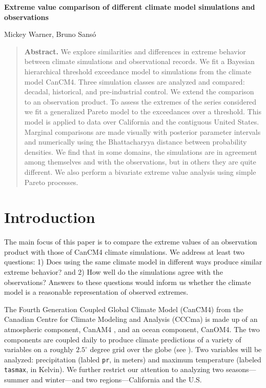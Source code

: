 \begin{Large}
\noindent \textbf{Extreme value comparison of different climate model simulations and observations}
\end{Large}
\bigskip

\noindent Mickey Warner, Bruno Sans{\'o}


\bigskip
\bigskip
\begin{quote}
\textbf{Abstract.} We explore similarities and differences in extreme behavior between climate simulations and observational records. We fit a Bayesian hierarchical threshold exceedance model to simulations from the climate model CanCM4. Three simulation classes are analyzed and compared: decadal, historical, and pre-industrial control. We extend the comparison to an observation product. To assess the extremes of the series considered we fit a generalized Pareto model to the exceedances over a threshold. This model is applied to data over California and the contiguous United States. Marginal comparisons are made visually with posterior parameter intervals and numerically using the Bhattacharyya distance between probability densities. We find that in some domains, the simulations are in agreement among themselves and with the observations, but in others they are quite different. We also perform a bivariate extreme value analysis using simple Pareto processes.
\end{quote}

\section{Introduction}
\label{intro}

The main focus of this paper is to compare the extreme values of an observation product with those of CanCM4 climate simulations. We address at least two questions: 1) Does using the same climate model in different ways produce similar extreme behavior? and 2) How well do the simulations agree with the observations? Answers to these questions would inform us whether the climate model is a reasonable representation of observed extremes.

The Fourth Generation Coupled Global Climate Model (CanCM4) from the Canadian Centre for Climate Modeling and Analysis (CCCma) is made up of an atmospheric component, CanAM4 \citep{von2013canadian}, and an ocean component, CanOM4. The two components are coupled daily to produce climate predictions of a variety of variables on a roughly $2.5^\circ$ degree grid over the globe (see \cite{merryfield2013canadian}). Two variables will be analyzed: precipitation (labled \texttt{pr}, in meters) and maximum temperature (labeled \texttt{tasmax}, in Kelvin). We further restrict our attention to analyzing two seasons---summer and winter---and two regions---California and the U.S.

